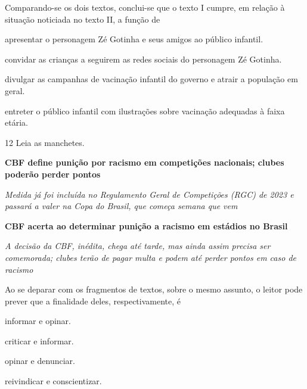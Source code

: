 Comparando-se os dois textos, conclui-se que o texto I cumpre, em
relação à situação noticiada no texto II, a função de

\begin{escolha}
\item apresentar o personagem Zé Gotinha e seus amigos ao público infantil.

\item convidar as crianças a seguirem as redes sociais do personagem Zé Gotinha.

\item divulgar as campanhas de vacinação infantil do governo e atrair a população em geral.

\item entreter o público infantil com ilustrações sobre vacinação adequadas
à faixa etária.
\end{escolha}

\num{12} Leia as manchetes.

\begin{myquote}
\centering
\textbf{CBF define punição por racismo em competições nacionais; clubes poderão perder pontos}

\textit{Medida já foi incluída no Regulamento Geral de Competições (RGC) de 2023 e passará a valer na Copa do Brasil, que começa semana que vem}
\end{myquote}

\begin{myquote}
\centering
\textbf{CBF acerta ao determinar punição a racismo em estádios no Brasil}

\textit{A decisão da CBF, inédita, chega até tarde, mas ainda assim precisa ser comemorada; clubes terão de pagar multa e podem até perder pontos em caso de racismo}
\end{myquote}

Ao se deparar com os fragmentos de textos, sobre o mesmo assunto,
o leitor pode prever que a finalidade deles, respectivamente, é

\begin{escolha}
\item informar e opinar.

\item criticar e informar.

\item opinar e denunciar.

\item reivindicar e conscientizar.
\end{escolha}


